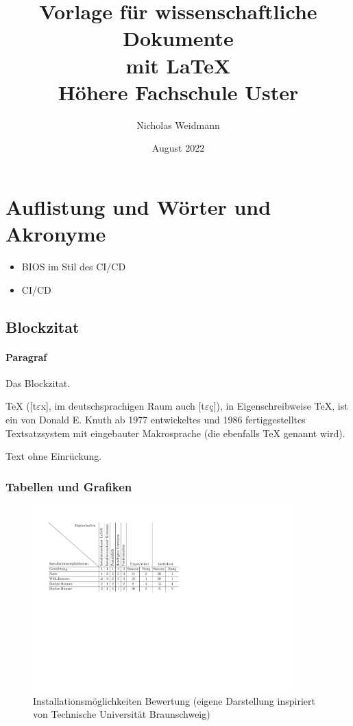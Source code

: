 \documentclass{article}
\title{Vorlage für wissenschaftliche Dokumente \protect\\ mit \LaTeX\\
\bigskip\large Höhere Fachschule Uster}
\author{Nicholas Weidmann}
\date{August 2022}
\begin{document}
\begin{titlepage}
  \maketitle
  \thispagestyle{empty}
\end{titlepage}

\tableofcontents
\clearpage

\section{Auflistung und Wörter und Akronyme}
\begin{itemize}
  \item \gls{BIOS} im Stil des \acrshort{CI/CD}
  \item \acrfull{CI/CD}
\end{itemize}

\subsection{Blockzitat}
\paragraph{Paragraf} Das Blockzitat.

\begin{displayquote}
  TeX ([t$\varepsilon$x], im deutschsprachigen Raum auch [t$\varepsilon$ç]), in Eigenschreibweise \TeX, ist ein von Donald E. Knuth ab 1977 entwickeltes und 1986 fertiggestelltes Textsatzsystem mit eingebauter Makrosprache (die ebenfalls TeX genannt wird).
  \cite{noauthor_tex_2022}
  \label{qte:tex}
\end{displayquote}

\noindent Text ohne Einrückung.

\subsubsection{Tabellen und Grafiken}

\begin{figure}[ht!]
  \centering
  \includegraphics[width=0.9\textwidth]{installoptions_grading.pdf}
  \caption{Installationsmöglichkeiten Bewertung (eigene Darstellung inspiriert von Technische Universität Braunschweig)\cite{noauthor_gewichtete_nodate}}
  \label{fig:installoptions_grading}
\end{figure}
\end{document}
